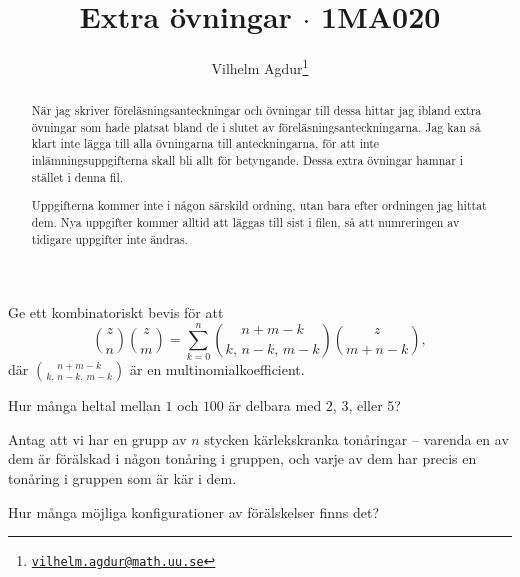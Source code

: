 \documentclass[nobib]{tufte-handout}
\title{Extra övningar $\cdot$ 1MA020}
\author[Vilhelm Agdur]{Vilhelm Agdur\thanks{\href{mailto:vilhelm.agdur@math.uu.se}{\nolinkurl{vilhelm.agdur@math.uu.se}}}}
\begin{document}

\maketitle%

\begin{abstract}
\noindent
När jag skriver föreläsningsanteckningar och övningar till dessa hittar jag ibland extra övningar som hade platsat bland de i slutet av föreläsningsanteckningarna. Jag kan så klart inte lägga till alla övningarna till anteckningarna, för att inte inlämningsuppgifterna skall bli allt för betyngande. Dessa extra övningar hamnar i stället i denna fil.

Uppgifterna kommer inte i någon särskild ordning, utan bara efter ordningen jag hittat dem. Nya uppgifter kommer alltid att läggas till sist i filen, så att numreringen av tidigare uppgifter inte ändras.
\end{abstract}

\begin{xca}
    Ge ett kombinatoriskt bevis för att
    $$\binom{z}{n}\binom{z}{m} = \sum_{k=0}^{n} \binom{n + m - k}{k,\,n-k,\,m-k}\binom{z}{m + n -k},$$
    där $\binom{n + m - k}{k,\,n-k,\,m-k}$ är en multinomialkoefficient.
\end{xca}

\begin{xca}
    Hur många heltal mellan $1$ och $100$ är delbara med $2$, $3$, eller $5$?
\end{xca}

\begin{xca}
  Antag att vi har en grupp av $n$ stycken kärlekskranka tonåringar -- varenda en av dem är förälskad i någon tonåring i gruppen, och varje av dem har precis en tonåring i gruppen som är kär i dem.

  Hur många möjliga konfigurationer av förälskelser finns det?
\end{xca}
\end{document}
